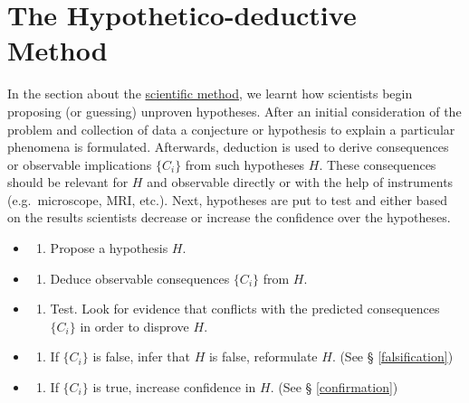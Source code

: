 \documentclass[
]{book}
\providecommand{\tightlist}{%
  \setlength{\itemsep}{0pt}\setlength{\parskip}{0pt}}
\begin{document}
\hypertarget{the-hypothetico-deductive-method}{%
\section{The Hypothetico-deductive Method}\label{the-hypothetico-deductive-method}}

In the section about the \protect\hyperlink{sci-method}{scientific method}, we learnt how scientists begin proposing (or guessing) unproven hypotheses. After an initial consideration of the problem and collection of data a conjecture or hypothesis to explain a particular phenomena is formulated. Afterwards, deduction is used to derive consequences or observable implications \(\{C_i\}\) from such hypotheses \(H\). These consequences should be relevant for \(H\) and observable directly or with the help of instruments (e.g.~microscope, MRI, etc.). Next, hypotheses are put to test and either based on the results scientists decrease or increase the confidence over the hypotheses.

\begin{itemize}
\item
  \begin{enumerate}
  \def\labelenumi{\arabic{enumi}.}
  \tightlist
  \item
    Propose a hypothesis \(H\).
  \end{enumerate}
\item
  \begin{enumerate}
  \def\labelenumi{\arabic{enumi}.}
  \setcounter{enumi}{1}
  \tightlist
  \item
    Deduce observable consequences \(\{C_i\}\) from \(H\).
  \end{enumerate}
\item
  \begin{enumerate}
  \def\labelenumi{\arabic{enumi}.}
  \setcounter{enumi}{2}
  \tightlist
  \item
    Test. Look for evidence that conflicts with the predicted consequences \(\{C_i\}\) in order to disprove \(H\).
  \end{enumerate}
\item
  \begin{enumerate}
  \def\labelenumi{\arabic{enumi}.}
  \setcounter{enumi}{3}
  \tightlist
  \item
    If \(\{C_i\}\) is false, infer that \(H\) is false, reformulate \(H\). (See § \ref{falsification})
  \end{enumerate}
\item
  \begin{enumerate}
  \def\labelenumi{\arabic{enumi}.}
  \setcounter{enumi}{4}
  \tightlist
  \item
    If \(\{C_i\}\) is true, increase confidence in \(H\). (See § \ref{confirmation})
  \end{enumerate}
\end{itemize}
\end{document}
